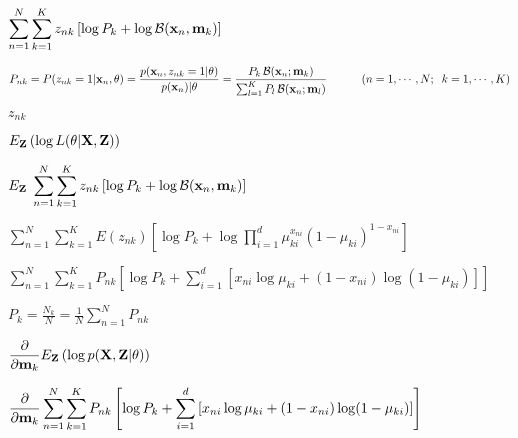 \documentclass{article}
\def\lthtmlcheckvsize{\ifdim\ht\sizebox<\vsize 
  \ifdim\wd\sizebox<\hsize\expandafter\hfill\fi \expandafter\vfill
  \else\expandafter\vss\fi}%
\begin{document}
{\newpage\clearpage
{}%
$\displaystyle \sum_{n=1}^N \sum_{k=1}^K {z_{nk}} \left[ \log P_k
+\log {\cal B}({\bf x}_n,{\bf m}_k)\right]$%
\lthtmlindisplaymathZ
\lthtmlcheckvsize\clearpage}

{\newpage\clearpage
{}%
$\displaystyle P_{nk}=P(z_{nk}=1|{\bf x}_n,{\bf\theta})
=\frac{p({\bf x}_n,z_{nk}=1|{\bf\theta})}{p({\bf x}_n)|{\bf\theta}}
=\frac{P_k\,{\cal B}({\bf x}_n;{\bf m}_k)}
{\sum_{l=1}^K P_l\,{\cal B}({\bf x}_n;{\bf m}_l)}
\;\;\;\;\;\;\;\;\;\;\;(n=1,\cdots,N;\;\;k=1,\cdots,K)$%
\lthtmlindisplaymathZ
\lthtmlcheckvsize\clearpage}

{\newpage\clearpage
{}%
$ z_{nk}$%
\lthtmlindisplaymathZ
\lthtmlcheckvsize\clearpage}

{\newpage\clearpage
{}%
$\displaystyle E_{\bf Z} \left(\log L({\bf\theta}|{\bf X},{\bf Z})\right)$%
\lthtmlindisplaymathZ
\lthtmlcheckvsize\clearpage}

{\newpage\clearpage
{}%
$\displaystyle E_{\bf Z}\;\sum_{n=1}^N \sum_{k=1}^K z_{nk}\left[\log P_k
+\log {\cal B}({\bf x}_n,{\bf m}_k)\right]$%
\lthtmlindisplaymathZ
\lthtmlcheckvsize\clearpage}

{\newpage\clearpage
{}%
$\displaystyle \sum_{n=1}^N \sum_{k=1}^K E(z_{nk}) \left[\log P_k
+\log \prod_{i=1}^d \mu_{ki}^{x_{ni}} (1-\mu_{ki})^{1-x_{ni}} \right]$%
\lthtmlindisplaymathZ
\lthtmlcheckvsize\clearpage}

{\newpage\clearpage
{}%
$\displaystyle \sum_{n=1}^N \sum_{k=1}^K P_{nk}   \left[\log P_k
+\sum_{i=1}^d \left[ x_{ni}\log\mu_{ki}+(1-x_{ni})\log(1-\mu_{ki}) \right]\right]$%
\lthtmlindisplaymathZ
\lthtmlcheckvsize\clearpage}

{\newpage\clearpage
{}%
$\displaystyle P_k=\frac{N_k}{N}=\frac{1}{N}\sum_{n=1}^N P_{nk}$%
\lthtmlindisplaymathZ
\lthtmlcheckvsize\clearpage}

{\newpage\clearpage
{}%
$\displaystyle \frac{\partial}{\partial{\bf m}_k}
E_{\bf Z}\left( \log p({\bf X},{\bf Z}|\theta) \right)$%
\lthtmlindisplaymathZ
\lthtmlcheckvsize\clearpage}

{\newpage\clearpage
{}%
$\displaystyle \frac{\partial}{\partial{\bf m}_k}
\sum_{n=1}^N \sum_{k=1}^K P_{nk}   \left[\log P_k
+\sum_{i=1}^d \left[ x_{ni}\log\mu_{ki}+(1-x_{ni})\log(1-\mu_{ki}) \right]\right]$%
\lthtmlindisplaymathZ
\lthtmlcheckvsize\clearpage}
\end{document}
